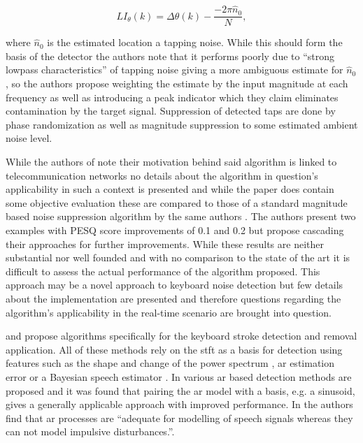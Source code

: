 \begin{equation}\label{eq:Sugiyama2013}
LI_\theta(k) = \Delta\theta(k) - \frac{-2 \pi \hat{n}_0}{N},
\end{equation}

where $\hat{n}_0$ is the estimated location a tapping noise. While this should form the basis of the detector the authors note that it performs poorly due to ``strong lowpass characteristics'' of tapping noise giving a more ambiguous estimate for $\hat{n}_0$, so the authors propose weighting the estimate by the input magnitude at each frequency as well as introducing a peak indicator which they claim eliminates contamination by the target signal. Suppression of detected taps are done by phase randomization as well as magnitude suppression to some estimated ambient noise level.

While the authors of \cite{Sugiyama2013} note their motivation behind said algorithm is linked to telecommunication networks no details about the algorithm in question's applicability in such a context is presented and while the paper does contain some objective evaluation these are compared to those of a standard magnitude based noise suppression algorithm by the same authors \cite{Sugiyama2002}. The authors present two examples with PESQ score improvements of 0.1 and 0.2 but propose cascading their approaches for further improvements. While these results are neither substantial nor well founded and with no comparison to the state of the art it is difficult to assess the actual performance of the algorithm proposed. This approach may be a novel approach to keyboard noise detection but few details about the implementation are presented and therefore questions regarding the algorithm's applicability in the real-time scenario are brought into question. 




and \cite{Sugiyama2007} propose algorithms specifically for the keyboard stroke detection and removal application. All of these methods rely on the \gls{stft} as a basis for detection using features such as the shape and change of the power spectrum \cite{Sugiyama2007}, \gls{ar} estimation error \cite{Subramanya2007}\cite{Kauppinen2002} or a Bayesian speech estimator \cite{Abramson2007}. In \cite{Godsill1998book} various \gls{ar} based detection methods are proposed and it was found that pairing the \gls{ar} model with a basis, e.g. a sinusoid, gives a generally applicable approach with improved performance. In \cite{Vaseghi1990} the authors find that \gls{ar} processes are ``adequate for modelling of speech signals whereas they can not model impulsive disturbances.''.

